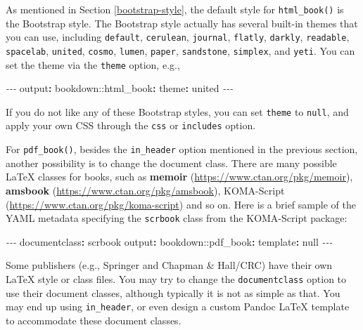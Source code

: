 \documentclass[
  12pt,
]{krantz}
\newenvironment{Shaded}{\begin{snugshade}}{\end{snugshade}}
\newcommand{\AttributeTok}[1]{\textcolor[rgb]{0.77,0.63,0.00}{#1}}
\newcommand{\CharTok}[1]{\textcolor[rgb]{0.31,0.60,0.02}{#1}}
\newcommand{\FunctionTok}[1]{\textcolor[rgb]{0.00,0.00,0.00}{#1}}
\newcommand{\KeywordTok}[1]{\textcolor[rgb]{0.13,0.29,0.53}{\textbf{#1}}}
\newcommand{\PreprocessorTok}[1]{\textcolor[rgb]{0.56,0.35,0.01}{\textit{#1}}}
\theoremstyle{definition}
\theoremstyle{definition}
\theoremstyle{definition}
\theoremstyle{definition}
\theoremstyle{remark}
\begin{document}
As mentioned in Section \ref{bootstrap-style}, the default style for \texttt{html\_book()} is the Bootstrap style. The Bootstrap style actually has several built-in themes that you can use, including \texttt{default}, \texttt{cerulean}, \texttt{journal}, \texttt{flatly}, \texttt{darkly}, \texttt{readable}, \texttt{spacelab}, \texttt{united}, \texttt{cosmo}, \texttt{lumen}, \texttt{paper}, \texttt{sandstone}, \texttt{simplex}, and \texttt{yeti}. You can set the theme via the \texttt{theme} option, e.g.,

\begin{Shaded}
\begin{Highlighting}[]
\PreprocessorTok{{-}{-}{-}}
\FunctionTok{output}\KeywordTok{:}
\AttributeTok{  bookdown:}\FunctionTok{:html\_book}\KeywordTok{:}
\AttributeTok{    }\FunctionTok{theme}\KeywordTok{:}\AttributeTok{ united}
\PreprocessorTok{{-}{-}{-}}
\end{Highlighting}
\end{Shaded}

If you do not like any of these Bootstrap styles, you can set \texttt{theme} to \texttt{null}, and apply your own CSS through the \texttt{css} or \texttt{includes} option.

For \texttt{pdf\_book()}, besides the \texttt{in\_header} option mentioned in the previous section, another possibility is to change the document class. There are many possible LaTeX classes for books, such as \textbf{memoir} (\url{https://www.ctan.org/pkg/memoir}), \textbf{amsbook} (\url{https://www.ctan.org/pkg/amsbook}), KOMA-Script (\url{https://www.ctan.org/pkg/koma-script}) and so on. Here is a brief sample of the YAML metadata specifying the \texttt{scrbook} class from the KOMA-Script package:

\begin{Shaded}
\begin{Highlighting}[]
\PreprocessorTok{{-}{-}{-}}
\FunctionTok{documentclass}\KeywordTok{:}\AttributeTok{ scrbook}
\FunctionTok{output}\KeywordTok{:}
\AttributeTok{  bookdown:}\FunctionTok{:pdf\_book}\KeywordTok{:}
\AttributeTok{    }\FunctionTok{template}\KeywordTok{:}\AttributeTok{ }\CharTok{null}
\PreprocessorTok{{-}{-}{-}}
\end{Highlighting}
\end{Shaded}

Some publishers (e.g., Springer and Chapman \& Hall/CRC) have their own LaTeX style or class files. You may try to change the \texttt{documentclass} option to use their document classes, although typically it is not as simple as that. You may end up using \texttt{in\_header}, or even design a custom Pandoc LaTeX template to accommodate these document classes.
\end{document}
